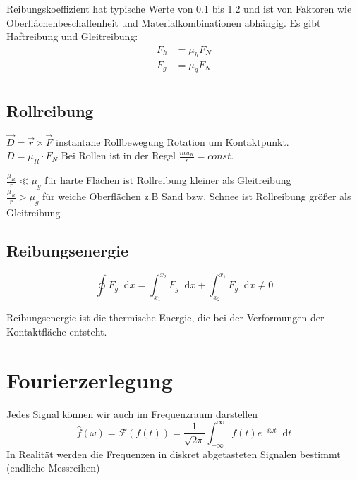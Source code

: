 \documentclass[a4paper,12pt]{report}
\newcommand*\diff{\mathop{}\!\mathrm{d}}
\begin{document}
Reibungskoeffizient hat typische Werte von 0.1 bis 1.2 und ist von Faktoren wie Oberflächenbeschaffenheit und Materialkombinationen abhängig. Es gibt Haftreibung und Gleitreibung:\\

\begin{align*}
F_h &= \mu_h F_N \\
F_g &= \mu_g F_N \\
\end{align*}

\subsection{Rollreibung}

$\vec{D} = \vec{r} \times \vec{F}  $ instantane Rollbewegung Rotation um Kontaktpunkt. \\

$D = \mu_R \cdot F_N$  \quad Bei Rollen ist in der Regel $\frac{mu_R}{r} = const.$

$\frac{\mu_R}{r} \ll \mu_g $ für harte Flächen ist Rollreibung kleiner als Gleitreibung \\

$\frac{\mu_R}{r} > \mu_g $	für weiche Oberflächen z.B Sand bzw. Schnee ist Rollreibung größer als Gleitreibung


\subsection{Reibungsenergie}

\begin{equation}
\oint F_g \diff x = \int_{x_1}^{x_2} F_g \diff x + \int_{x_2}^{x_1} F_g \diff x \neq 0 
\end{equation}

Reibungsenergie ist die thermische Energie, die bei der Verformungen der Kontaktfläche entsteht.


\section{Fourierzerlegung}
Jedes Signal können wir auch im Frequenzraum darstellen
\begin{equation}
\hat{f}(\omega) = \mathcal{F}(f(t)) = \frac{1}{\sqrt{2 \pi}} \int_{- \infty}^\infty f(t) e^{-i\omega t} \diff t 
\end{equation}
In Realität werden die Frequenzen in diskret abgetasteten Signalen bestimmt (endliche Messreihen)
\end{document}
